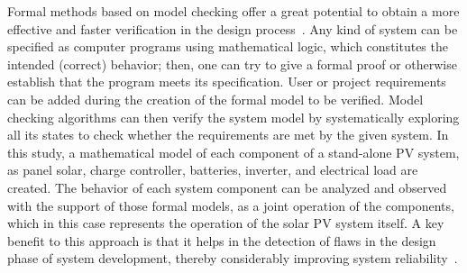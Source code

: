 \documentclass[journal]{IEEEtran}
\begin{document}
Formal methods based on model checking offer a great potential to obtain a more effective and faster verification in the design process~\cite{ClarkeHV18}.  
Any kind of system can be specified as computer programs using mathematical logic, which constitutes the intended (correct) behavior; then, one can try to give a formal proof or otherwise establish that the program meets its specification. User or project requirements can be added during the creation of the formal model to be verified. %
%
%
Model checking algorithms can then verify the system model by systematically exploring all its states to check whether the requirements are met by the given system.
%
%
In this study, a mathematical model of each component of a stand-alone PV system, as panel solar, charge controller, batteries, inverter, and electrical load are created. The behavior of each system component can be analyzed and observed with the support of those formal models, as a joint operation of the components, which in this case represents the operation of the solar PV system itself. A key benefit to this approach is that it helps in the detection of flaws in the design phase of system development, thereby considerably improving system reliability~\cite{Akram2018}.
\end{document}
